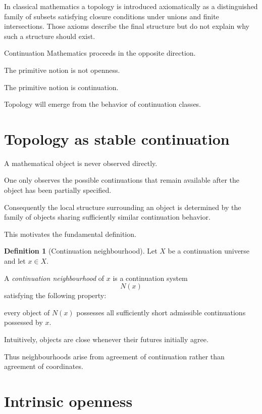 \documentclass[13pt,openany]{book}
\theoremstyle{plain}
\theoremstyle{definition}
\newtheorem{definition}{Definition}[chapter]
\begin{document}
In classical mathematics a topology is introduced axiomatically as a distinguished family of subsets satisfying closure conditions under unions and finite intersections. Those axioms describe the final structure but do not explain why such a structure should exist.

Continuation Mathematics proceeds in the opposite direction.

The primitive notion is not openness.

The primitive notion is continuation.

Topology will emerge from the behavior of continuation classes.

\section{Topology as stable continuation}

A mathematical object is never observed directly.

One only observes the possible continuations that remain available after the object has been partially specified.

Consequently the local structure surrounding an object is determined by the family of objects sharing sufficiently similar continuation behavior.

This motivates the fundamental definition.

\begin{definition}[Continuation neighbourhood]
Let $X$ be a continuation universe and let $x\in X$.

A \emph{continuation neighbourhood} of $x$ is a continuation system
\[
N(x)
\]
satisfying the following property:

every object of $N(x)$ possesses all sufficiently short admissible continuations possessed by $x$.
\end{definition}

Intuitively, objects are close whenever their futures initially agree.

Thus neighbourhoods arise from agreement of continuation rather than agreement of coordinates.

\section{Intrinsic openness}
\end{document}
